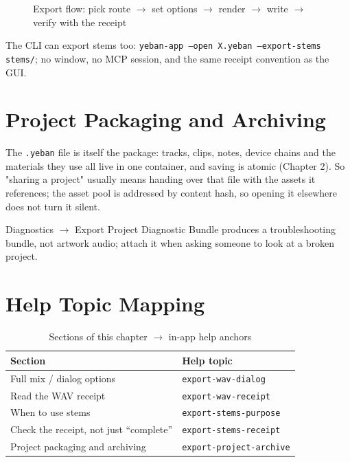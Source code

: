 \begin{figure}[htbp]
\centering
{}
\caption{Export flow: pick route $\to$ set options $\to$ render $\to$ write $\to$ verify with the receipt}
\label{fig:ch08-export-flow}
\end{figure}

The CLI can export stems too: \texttt{yeban-app --open X.yeban --export-stems stems/};
no window, no MCP session, and the same receipt convention as the GUI.

\section{Project Packaging and Archiving}

The \texttt{.yeban} file is itself the package: tracks, clips, notes, device chains and
the materials they use all live in one container, and saving is atomic (Chapter 2).
So "sharing a project" usually means handing over that file with the assets it
references; the asset pool is addressed by content hash, so opening it elsewhere does
not turn it silent.

Diagnostics $\to$ Export Project Diagnostic Bundle produces a troubleshooting bundle,
not artwork audio; attach it when asking someone to look at a broken project.

\section{Help Topic Mapping}

\begin{table}[htbp]
\centering
\caption{Sections of this chapter $\to$ in-app help anchors}
\label{tab:ch08-help}
\begin{tabular}{ll}
\hline
Section & Help topic \\
\hline
Full mix / dialog options & \texttt{export-wav-dialog} \\
Read the WAV receipt & \texttt{export-wav-receipt} \\
When to use stems & \texttt{export-stems-purpose} \\
Check the receipt, not just ``complete'' & \texttt{export-stems-receipt} \\
Project packaging and archiving & \texttt{export-project-archive} \\
\hline
\end{tabular}
\end{table}

